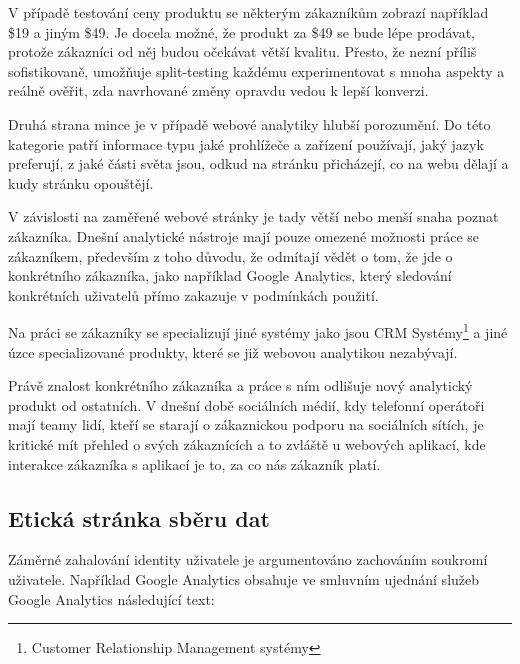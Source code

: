 \documentclass[bc,male,java,dept456]{diploma}						%
\begin{document}
V případě testování ceny produktu se některým zákazníkům zobrazí například \$19 a jiným \$49. Je docela možné, že produkt za \$49 se bude lépe prodávat, protože zákazníci od něj budou očekávat větší kvalitu. Přesto, že nezní příliš sofistikovaně, umožňuje split-testing každému experimentovat s mnoha aspekty a reálně ověřit, zda navrhované změny opravdu vedou k lepší konverzi.




Druhá strana mince je v případě webové analytiky hlubší porozumění. Do této kategorie patří informace typu jaké prohlížeče a zařízení používají, jaký jazyk preferují, z jaké části světa jsou, odkud na stránku přicházejí, co na webu dělají a kudy stránku opouštějí. 

V závislosti na zaměřené webové stránky je tady větší nebo menší snaha poznat zákazníka. Dnešní analytické nástroje mají pouze omezené možnosti práce se zákazníkem, především z toho důvodu, že odmítají vědět o tom, že jde o konkrétního zákazníka, jako například Google Analytics, který sledování konkrétních uživatelů přímo zakazuje v podmínkách použití.

Na práci se zákazníky se specializují jiné systémy jako jsou CRM Systémy\footnote{Customer Relationship Management systémy} a jiné úzce specializované produkty, které se již webovou analytikou nezabývají. 

Právě znalost konkrétního zákazníka a práce s ním odlišuje nový analytický produkt od ostatních. V dnešní době sociálních médií, kdy telefonní operátoři mají teamy lidí, kteří se starají o zákaznickou podporu na sociálních sítích, je kritické mít přehled o svých zákaznících a to zvláště u webových aplikací, kde interakce zákazníka s aplikací je to, za co nás zákazník platí.



\subsection{Etická stránka sběru dat}

Záměrné zahalování identity uživatele je argumentováno zachováním soukromí u\-ži\-va\-te\-le. Například Google Analytics obsahuje ve smluvním ujednání služeb Google Analytics následující text:
\end{document}
